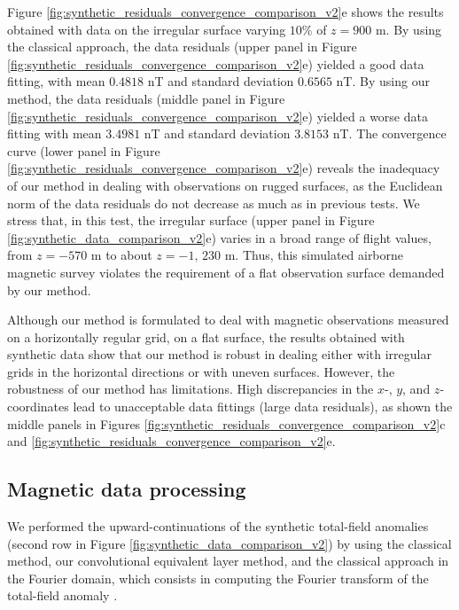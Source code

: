 \documentclass[manuscript,noblind]{geophysics}
\begin{document}
Figure \ref{fig:synthetic_residuals_convergence_comparison_v2}e shows the results obtained
with data on the irregular surface varying $10\%$ of $z = 900$ m.
By using the classical approach, the data residuals (upper panel in 
Figure \ref{fig:synthetic_residuals_convergence_comparison_v2}e) 
yielded a good data fitting, with mean $0.4818$ nT and standard deviation $0.6565$ nT. 
By using our method, the data residuals (middle panel in 
Figure \ref{fig:synthetic_residuals_convergence_comparison_v2}e) yielded a worse data fitting 
with mean $3.4981$ nT and standard deviation $3.8153$ nT.
The convergence curve (lower panel in Figure \ref{fig:synthetic_residuals_convergence_comparison_v2}e)
reveals the inadequacy of our method in dealing with observations on rugged surfaces, as 
the Euclidean norm of the data residuals do not decrease as much as in previous tests. 
We stress that, in this test, the irregular surface (upper panel in Figure 
\ref{fig:synthetic_data_comparison_v2}e) varies in a broad range of flight values, from $z = - 570$ m to about 
$z = -1,\, 230$ m. Thus, this simulated airborne magnetic survey violates the requirement 
of a flat observation surface demanded by our method.

Although our method is formulated to deal with magnetic observations measured on 
a horizontally regular grid, on a flat surface, the results obtained with synthetic 
data show that our method is robust in dealing either with irregular grids in the 
horizontal directions or with uneven surfaces.
However, the robustness of our method has limitations.
High discrepancies in the $x$-, $y$, and $z$-coordinates lead to unacceptable 
data fittings (large data residuals), as shown the middle panels in Figures 
\ref{fig:synthetic_residuals_convergence_comparison_v2}c and
\ref{fig:synthetic_residuals_convergence_comparison_v2}e.

\subsection*{Magnetic data processing}

We performed the upward-continuations of the synthetic total-field anomalies 
(second row in Figure \ref{fig:synthetic_data_comparison_v2}) by using 
the classical method, our convolutional equivalent layer method, and 
the classical approach in the Fourier domain,
which consists in computing the Fourier transform of the total-field anomaly 
\citep[e.g.,][ p. 317]{blakely1996}. 
\end{document}
